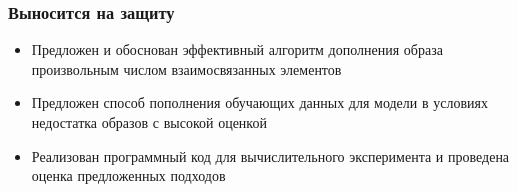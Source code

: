 \documentclass[10pt]{beamer}
\begin{document}
\begin{frame}
	\frametitle{Выносится на защиту}
		\begin{itemize}
			\item Предложен и обоснован эффективный алгоритм дополнения образа произвольным числом взаимосвязанных элементов
			\item Предложен способ пополнения обучающих данных для модели в условиях недостатка образов с высокой оценкой
			\item Реализован программный код для вычислительного эксперимента и проведена оценка предложенных подходов				
		\end{itemize}
\end{frame}
\end{document}
